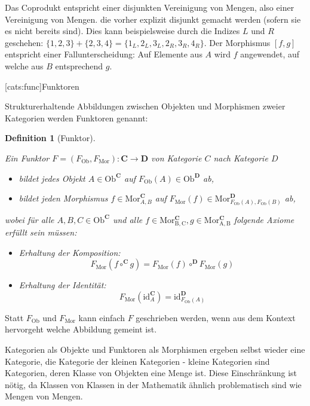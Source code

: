 \documentclass[11pt, a4paper, bibgerm]{book}
\newcommand\lsection{}
\newtheorem{defini}{Definition}
\newcommand{\defi}[2]{%
  \begin{defini}[#1]
    \label{def:#1}
    #2
  \end{defini}
}
\begin{document}
Das Coprodukt entspricht einer disjunkten Vereinigung von Mengen, also
einer Vereinigung von Mengen. die vorher explizit disjunkt gemacht
werden (sofern sie es nicht bereits sind). Dies kann beispielsweise durch
die Indizes $L$ und $R$ geschehen: $\{1,2,3\} + \{2,3,4\} =
\{1_L,2_L,3_L,2_R,3_R,4_R\}$. Der Morphismus $[f,g]$ entspricht einer
Fallunterscheidung: Auf Elemente aus $A$ wird $f$ angewendet, auf welche
aus $B$ entsprechend $g$.

\lsection[cats:func]{Funktoren}

Strukturerhaltende Abbildungen zwischen Objekten und Morphismen zweier
Kategorien werden Funktoren genannt:

\defi{Funktor}{
Ein Funktor $F=(F_{\mathrm{Ob}},F_{\mathrm{Mor}}) : \mathbf{C}
\rightarrow \mathbf{D}$ von Kategorie $C$ nach Kategorie $D$
    \begin{itemize}
    \item bildet jedes Objekt $A \in \mathrm{Ob}^{\mathbf{C}}$ auf $F_{\mathrm{Ob}}(A) \in
      \mathrm{Ob}^{\mathbf{D}}$ ab,
    \item bildet jeden Morphismus $f \in
      \mathrm{Mor}^{\mathbf{C}}_{A,B}$ auf $F_{\mathrm{Mor}}(f) \in
      \mathrm{Mor}^{\mathbf{D}}_{F_{\mathrm{Ob}}(A),F_{\mathrm{Ob}}(B)}$
      ab,
    \end{itemize}
    wobei für alle $A,B,C \in \mathrm{Ob}^{\mathbf{C}}$ und alle $f \in
    \mathrm{Mor^{\mathbf{C}}_{B,C}},g \in
    \mathrm{Mor^{\mathbf{C}}_{A,B}}$ folgende Axiome erfüllt sein
    müssen:
    \begin{itemize}
    \item Erhaltung der Komposition:
      $$F_{\mathrm{Mor}}(f \circ^{\mathbf{C}} g) =
      F_{\mathrm{Mor}}(f) \circ^{\mathbf{D}} F_{\mathrm{Mor}}(g)$$
    \item Erhaltung der Identität:
      $$F_{\mathrm{Mor}}(\mathrm{id}^{\mathbf{C}}_A) =
      \mathrm{id}^{\mathbf{D}}_{F_{\mathrm{Ob}}(A)}$$
    \end{itemize}
}

Statt $F_{\mathrm{Ob}}$ und $F_{\mathrm{Mor}}$ kann einfach $F$
geschrieben werden, wenn aus dem Kontext hervorgeht welche Abbildung
gemeint ist.

Kategorien als Objekte und Funktoren als Morphismen ergeben selbst
wieder eine Kategorie, die Kategorie der kleinen Kategorien - kleine
Kategorien sind Kategorien, deren Klasse von Objekten eine Menge
ist. Diese Einschränkung ist nötig, da Klassen von Klassen in der
Mathematik ähnlich problematisch sind wie Mengen von Mengen.
\end{document}
